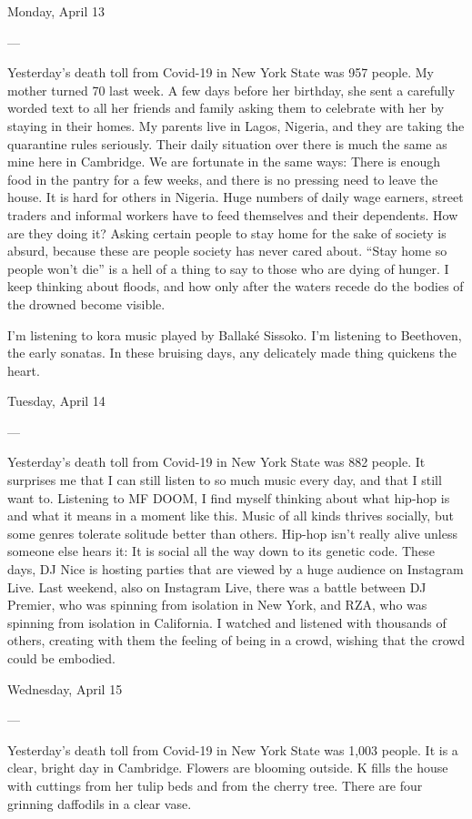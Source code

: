 Monday, April 13

---

Yesterday's death toll from Covid-19 in New York State was 957 people.
My mother turned 70 last week. A few days before her birthday, she sent
a carefully worded text to all her friends and family asking them to
celebrate with her by staying in their homes. My parents live in Lagos,
Nigeria, and they are taking the quarantine rules seriously. Their daily
situation over there is much the same as mine here in Cambridge. We are
fortunate in the same ways: There is enough food in the pantry for a few
weeks, and there is no pressing need to leave the house. It is hard for
others in Nigeria. Huge numbers of daily wage earners, street traders
and informal workers have to feed themselves and their dependents. How
are they doing it? Asking certain people to stay home for the sake of
society is absurd, because these are people society has never cared
about. ``Stay home so people won't die'' is a hell of a thing to say to
those who are dying of hunger. I keep thinking about floods, and how
only after the waters recede do the bodies of the drowned become
visible.

I'm listening to kora music played by Ballaké Sissoko. I'm listening to
Beethoven, the early sonatas. In these bruising days, any delicately
made thing quickens the heart.

Tuesday, April 14

---

Yesterday's death toll from Covid-19 in New York State was 882 people.
It surprises me that I can still listen to so much music every day, and
that I still want to. Listening to MF DOOM, I find myself thinking about
what hip-hop is and what it means in a moment like this. Music of all
kinds thrives socially, but some genres tolerate solitude better than
others. Hip-hop isn't really alive unless someone else hears it: It is
social all the way down to its genetic code. These days, DJ Nice is
hosting parties that are viewed by a huge audience on Instagram Live.
Last weekend, also on Instagram Live, there was a battle between DJ
Premier, who was spinning from isolation in New York, and RZA, who was
spinning from isolation in California. I watched and listened with
thousands of others, creating with them the feeling of being in a crowd,
wishing that the crowd could be embodied.

Wednesday, April 15

---

Yesterday's death toll from Covid-19 in New York State was 1,003 people.
It is a clear, bright day in Cambridge. Flowers are blooming outside. K
fills the house with cuttings from her tulip beds and from the cherry
tree. There are four grinning daffodils in a clear vase.


